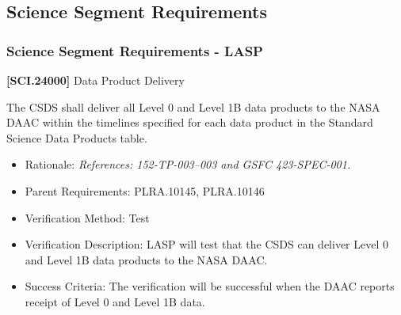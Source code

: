 \documentclass[12pt,oneside,oldfontcommands]{memoir}
\begin{document}
\subsection{Science Segment Requirements}
\label{sciencesegmentrequirements}

\subsubsection{Science Segment Requirements - LASP}
\label{sciencesegmentrequirements-lasp}

\textbf{[SCI.24000]} Data Product Delivery

The \gls{CSDS} shall deliver all Level 0 and Level 1B data products to the NASA \gls{DAAC} within the timelines specified for each data product in the Standard Science Data Products table.

\begin{itemize}
\item{} Rationale: \emph{References: 152-TP-003--003 and GSFC 423-SPEC-001.}

\item{} Parent Requirements: PLRA.10145, PLRA.10146

\item{} Verification Method: Test

\item{} Verification Description: \gls{LASP} will \gls{test} that the \gls{CSDS} can deliver Level 0 and Level 1B data products to the NASA \gls{DAAC}.

\item{} Success Criteria: The verification will be successful when the \gls{DAAC} reports receipt of Level 0 and Level 1B data.

\end{itemize}
\end{document}
